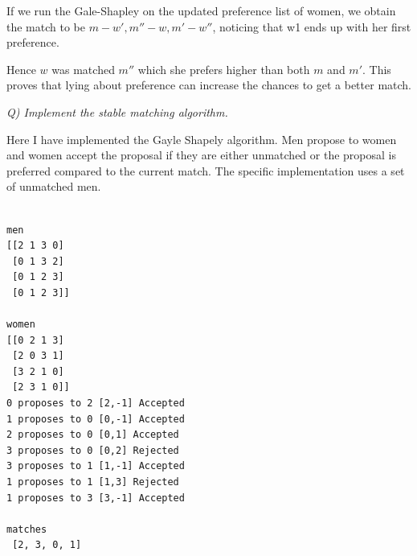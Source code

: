 \documentclass{homeworg}
\begin{document}
If we run the Gale-Shapley on the updated preference list of women, we obtain the match to be $m-w', m''-w, m'-w''$, noticing that w1 ends up with her first preference.

Hence $w$ was matched $m''$ which she prefers higher than both $m$ and $m'$. This proves that lying about preference can increase the chances to get a better match. 
\newpage

\exercise
\emph{Q) Implement the stable matching algorithm.}

Here I have implemented the Gayle Shapely algorithm. Men propose to women and women accept the proposal if they are either unmatched or the proposal is preferred compared to the current match. The specific implementation uses a set of unmatched men.
\begin{verbatim}

men
[[2 1 3 0] 
 [0 1 3 2] 
 [0 1 2 3] 
 [0 1 2 3]]

women      
[[0 2 1 3] 
 [2 0 3 1] 
 [3 2 1 0] 
 [2 3 1 0]]
0 proposes to 2 [2,-1] Accepted
1 proposes to 0 [0,-1] Accepted
2 proposes to 0 [0,1] Accepted
3 proposes to 0 [0,2] Rejected
3 proposes to 1 [1,-1] Accepted
1 proposes to 1 [1,3] Rejected
1 proposes to 3 [3,-1] Accepted

matches
 [2, 3, 0, 1]

\end{verbatim}
\end{document}
